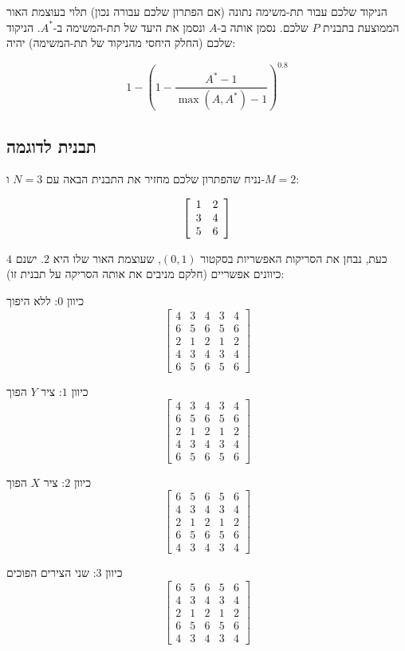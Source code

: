 \documentclass[12pt]{article}
\begin{document}
הניקוד שלכם עבור תת-משימה נתונה (אם הפתרון שלכם עבורה נכון) תלוי בעוצמת האור הממוצעת בתבנית $P$ שלכם. נסמן אותה ב-$A$ ונסמן את היעד של תת-המשימה ב-$A^*$. הניקוד שלכם (החלק היחסי מהניקוד של תת-המשימה) יהיה:

$$1 - {\left(1 - \frac{A^* - 1}{\max{\left(A, A^*\right)} - 1}\right)}^{0.8}$$

\subsection{תבנית לדוגמה}

נניח שהפתרון שלכם מחזיר את התבנית הבאה עם $N=3$ ו-$M=2$:
 
\[
\left[
\begin{array}{c c}
1 & 2 \\
3 & 4 \\
5 & 6
\end{array}
\right]
\]
 
כעת, נבחן את הסריקות האפשריות בסקטור $(0, 1)$, שעוצמת האור שלו היא $2$. ישנם $4$ כיוונים אפשריים (חלקם מניבים את אותה הסריקה על תבנית זו):
 
כיוון $0$: ללא היפוך
\[
\left[
\begin{array}{ccccc}
4 & 3 & 4 & 3 & 4 \\
6 & 5 & 6 & 5 & 6 \\
2 & 1 & 2 & 1 & 2 \\
4 & 3 & 4 & 3 & 4 \\
6 & 5 & 6 & 5 & 6
\end{array}
\right]
\]
 
כיוון $1$: ציר $Y$ הפוך
\[
\left[
\begin{array}{ccccc}
4 & 3 & 4 & 3 & 4 \\
6 & 5 & 6 & 5 & 6 \\
2 & 1 & 2 & 1 & 2 \\
4 & 3 & 4 & 3 & 4 \\
6 & 5 & 6 & 5 & 6
\end{array}
\right]
\]
 
כיוון $2$: ציר $X$ הפוך
\[
\left[
\begin{array}{ccccc}
6 & 5 & 6 & 5 & 6 \\
4 & 3 & 4 & 3 & 4 \\
2 & 1 & 2 & 1 & 2 \\
6 & 5 & 6 & 5 & 6 \\
4 & 3 & 4 & 3 & 4
\end{array}
\right]
\]
 
כיוון $3$: שני הצירים הפוכים
\[
\left[
\begin{array}{ccccc}
6 & 5 & 6 & 5 & 6 \\
4 & 3 & 4 & 3 & 4 \\
2 & 1 & 2 & 1 & 2 \\
6 & 5 & 6 & 5 & 6 \\
4 & 3 & 4 & 3 & 4
\end{array}
\right]
\]
 
\end{document}
